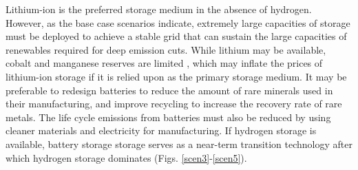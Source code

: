 Lithium-ion is the preferred storage medium in the absence of hydrogen. However, as the base case scenarios indicate, extremely large capacities of storage must be deployed to achieve a stable grid that can sustain the large capacities of renewables required for deep emission cuts. While lithium may be available, cobalt and manganese reserves are limited \cite{scrosati_lithium-ion_2011,simon_potential_2015,turcheniuk_ten_2018} , which may inflate the prices of lithium-ion storage if it is relied upon as the primary storage medium. It may be preferable to redesign batteries to reduce the amount of rare minerals used in their manufacturing, and improve recycling to increase the recovery rate of rare metals. The life cycle emissions from batteries must also be reduced by using cleaner materials and electricity for manufacturing. If hydrogen storage is available, battery storage storage serves as a near-term transition technology after which hydrogen storage dominates (Figs. \ref{scen3}-\ref{scen5}).

